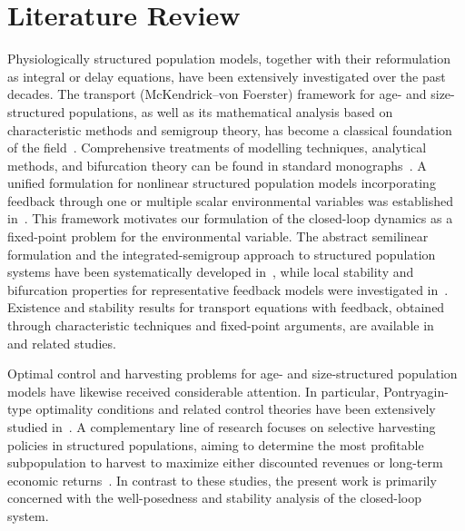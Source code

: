 \documentclass[pdflatex,sn-mathphys-num]{sn-jnl}
\theoremstyle{plain}
\theoremstyle{definition}
\theoremstyle{remark}
\begin{document}
\section{Literature Review}
\label{sec:lite_review}
Physiologically structured population models, together with their reformulation as integral or delay equations, have been extensively investigated over the past decades. The transport (McKendrick--von Foerster) framework for age- and size-structured populations, as well as its mathematical analysis based on characteristic methods and semigroup theory, has become a classical foundation of the field~\cite{metz2014dynamics,wang2026damage,webb1985theory,liang2025global,yu2026rigorous,yu2026microscopic,gurtin1974non}. Comprehensive treatments of modelling techniques, analytical methods, and bifurcation theory can be found in standard monographs~\cite{iannelli1995mathematical,iannelli2017basic,cushing1998introduction,thieme2018mathematics,de1997gentle,metz2014dynamics,murray2007mathematical,perthame2007transport,liu2025bidirectional}. A unified formulation for nonlinear structured population models incorporating feedback through one or multiple scalar environmental variables was established in~\cite{diekmann1998formulation,diekmann2001formulation,diekmann2003steady,akimenko2018two,diekmann2020finite,diekmann2020models,yu2026microscopic,barril2022formulation,barril2024hierarchical,cai2026optimal}. This framework motivates our formulation of the closed-loop dynamics as a fixed-point problem for the environmental variable. The abstract semilinear formulation and the integrated-semigroup approach to structured population systems have been systematically developed in~\cite{magal2018theory,kang2022age,ducrot2021integrated,liang2026separation}, while local stability and bifurcation properties for representative feedback models were investigated in~\cite{diekmann2010daphnia,scarabel2021numerical,yu2026size}. Existence and stability results for transport equations with feedback, obtained through characteristic techniques and fixed-point arguments, are available in~\cite{calsina1995model,wang2026elliptic,bartlomiejczyk2015existence} and related studies.

Optimal control and harvesting problems for age- and size-structured population models have likewise received considerable attention. In particular, Pontryagin-type optimality conditions and related control theories have been extensively studied in~\cite{brokate1985pontryagin,feichtinger2003optimality,wu2025age,kumar2023stability,ni2023optimal,wu2025analysis,filho2025mathematical,kato2024measure,yu2026age}. A complementary line of research focuses on selective harvesting policies in structured populations, aiming to determine the most profitable subpopulation to harvest to maximize either discounted revenues or long-term economic returns~\cite{easterling2000size,fadlovich2025selectivity,wang2025multi,stubberud2019effects}. In contrast to these studies, the present work is primarily concerned with the well-posedness and stability analysis of the closed-loop system.
\end{document}
